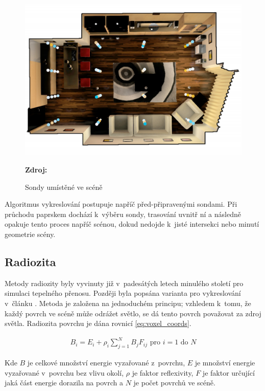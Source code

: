 \begin{figure}[H]
	\centering
	\includegraphics[scale=0.25]{obrazky-figures/light_field_probes.png}
	\caption{Sondy umístěné ve scéně}
	\textbf{Zdroj: \cite{light_field_probes}}
	\label{fig:ray_marching}
\end{figure}

Algoritmus vykreslování postupuje napříč před-připravenými sondami. Při průchodu paprskem dochází k~výběru sondy, trasování uvnitř ní a následně opakuje tento proces napříč scénou, dokud nedojde k~jisté intersekci nebo minutí geometrie scény.

\subsection{Radiozita}
Metody radiozity byly vyvinuty již v~padesátých letech minulého století pro simulaci tepelného přenosu. Později byla popsána varianta pro vykreslování v~článku \cite{radiosity}. Metoda je založena na jednoduchém principu; vzhledem k~tomu, že každý povrch ve scéně může odrážet světlo, se dá tento povrch považovat za zdroj světla. Radiozita povrchu je dána rovnicí \ref{eq:voxel_coords}.


\begin{equation} \label{eq:voxel_coords}
	\begin{gathered}
		B_i = E_i + \rho_i \sum^N_{j = 1}B_jF_{ij} \text{ pro } i = 1 \text{ do } N
	\end{gathered}
\end{equation}

Kde $B$ je celkové množství energie vyzařované z~povrchu, $E$ je množství energie vyzařované v~povrchu bez vlivu okolí, $\rho$ je faktor reflexivity, $F$ je faktor určující jaká část energie dorazila na povrch a $N$ je počet povrchů ve scéně.

